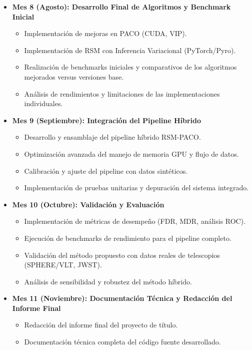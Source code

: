 \documentclass[final,letterpaper,oneside,authoryear,11pt,singlespace,spanish]{ezthesis}
\begin{document}
\begin{itemize}[leftmargin=*,labelsep=0.5cm]
    \item \textbf{Mes 8 (Agosto): Desarrollo Final de Algoritmos y Benchmark Inicial}
    \begin{itemize}
        \item Implementación de mejoras en PACO (CUDA, VIP).
        \item Implementación de RSM con Inferencia Variacional (PyTorch/Pyro).
        \item Realización de benchmarks iniciales y comparativos de los algoritmos mejorados versus versiones base.
        \item Análisis de rendimientos y limitaciones de las implementaciones individuales.
    \end{itemize}
    \item \textbf{Mes 9 (Septiembre): Integración del Pipeline Híbrido}
    \begin{itemize}
        \item Desarrollo y ensamblaje del pipeline híbrido RSM-PACO.
        \item Optimización avanzada del manejo de memoria GPU y flujo de datos.
        \item Calibración y ajuste del pipeline con datos sintéticos.
        \item Implementación de pruebas unitarias y depuración del sistema integrado.
    \end{itemize}
    \item \textbf{Mes 10 (Octubre): Validación y Evaluación}
    \begin{itemize}
        \item Implementación de métricas de desempeño (FDR, MDR, análisis ROC).
        \item Ejecución de benchmarks de rendimiento para el pipeline completo.
        \item Validación del método propuesto con datos reales de telescopios (SPHERE/VLT, JWST).
        \item Análisis de sensibilidad y robustez del método híbrido.
    \end{itemize}
    \item \textbf{Mes 11 (Noviembre): Documentación Técnica y Redacción del Informe Final}
    \begin{itemize}
        \item Redacción del informe final del proyecto de título.
        \item Documentación técnica completa del código fuente desarrollado.

\end{itemize}
\end{itemize}
\end{document}
